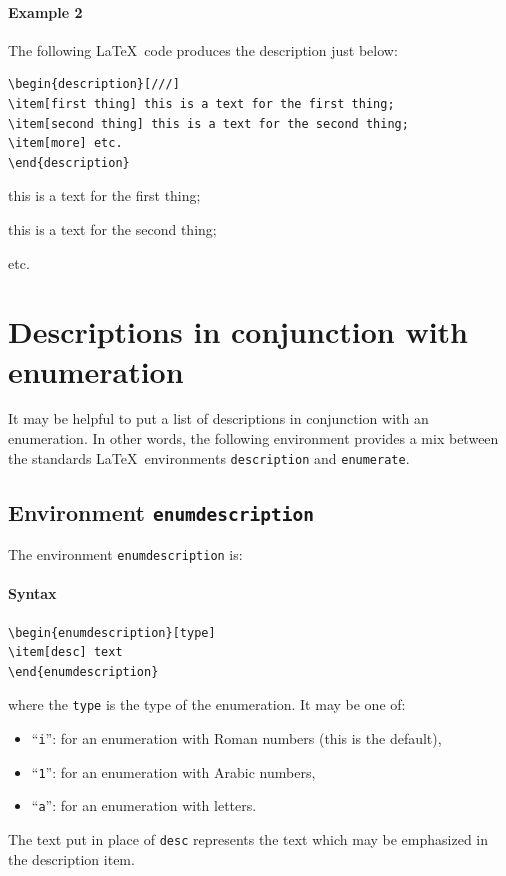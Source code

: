 \documentclass[book,taskpackage,specpackage,codepackage]{upmethodology-document}
\begin{document}
\paragraph{Example 2} The following \LaTeX~code produces the description just below:
\begin{verbatim}
\begin{description}[///]
\item[first thing] this is a text for the first thing;
\item[second thing] this is a text for the second thing;
\item[more] etc.
\end{description}
\end{verbatim}

\begin{description}[///]
\item[first thing] this is a text for the first thing;
\item[second thing] this is a text for the second thing;
\item[more] etc.
\end{description}

\section{Descriptions in conjunction with enumeration}

It may be helpful to put a list of descriptions in conjunction with an enumeration.
In other words, the following environment provides a mix between the standards \LaTeX~environments \texttt{description} and \texttt{enumerate}.

\subsection{Environment \texttt{enumdescription}}

The environment \texttt{enumdescription} is:

\paragraph{Syntax}
\begin{verbatim}
\begin{enumdescription}[type]
\item[desc] text
\end{enumdescription}
\end{verbatim}
where the \texttt{type} is the type of the enumeration. It may be one of:
\begin{itemize}
\item ``\texttt{i}'': for an enumeration with Roman numbers (this is the default),
\item ``\texttt{1}'': for an enumeration with Arabic numbers,
\item ``\texttt{a}'': for an enumeration with letters.
\end{itemize}
The text put in place of \texttt{desc} represents the text which may be emphasized in the description item.
\end{document}
